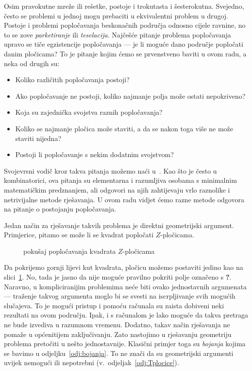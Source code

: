 \documentclass[11pt]{scrartcl}
\begin{document}
Osim pravokutne mreže ili rešetke, postoje i trokutasta i šesterokutna. Svejedno, često se problemi u jednoj mogu prebaciti u ekvivalentni problem u drugoj. Postoje i problemi popločavanja beskonačnih područja odnosno cijele ravnine, no to se zove \emph{parketiranje} ili \emph{teselacija}. Najčešće pitanje problema popločavanja upravo se tiče egzistencije popločavanja --- je li moguće dano područje popločati danim pločicama? To je pitanje kojim ćemo se prvenstveno baviti u ovom radu, a neka od drugih su:
\begin{itemize}
\item Koliko različitih popločavanja postoji?
\item Ako popločavanje ne postoji, koliko najmanje polja može ostati nepokriveno?
\item Koja su zajednička svojstva raznih popločavanja?
\item Koliko se najmanje pločica može staviti, a da se nakon toga više ne može staviti nijedna?
\item Postoji li popločavanje s nekim dodatnim svojstvom?
\end{itemize}

Svojevrsni vodič kroz takva pitanja možemo naći u~\cite{tilings}. Kao što je često u kombinatorici, ova pitanja su elementarna i razumljiva osobama s minimalnim matematičkim predznanjem, ali odgovori na njih zahtijevaju vrlo raznolike i netrivijalne metode rješavanja. U ovom radu vidjet ćemo razne metode odgovora na pitanje o postojanju popločavanja.

Jedan način za rješavanje takvih problema je direktni geometrijski argument. Primjerice, pitamo se može li se kvadrat popločati $Z$-pločicama.
\begin{figure}[h!]
\centering
{}
\caption{pokušaj popločavanja kvadrata $Z$-pločicama}
\label{slikaZ}
\end{figure}
Da pokrijemo gornji lijevi kut kvadrata, pločicu možemo postaviti jedino kao na slici~\ref{slikaZ}. No, tada je jasno da nije moguće pravilno pokriti polje označeno s \textbf{?}. Naravno, u kompliciranijim problemima neće biti ovako jednostavnih argumenata --- traženje takvog argumenta moglo bi se svesti na iscrpljivanje svih mogućih slučajeva. To je mogući pristup i pomoću računala su zaista dobiveni neki rezultati na ovom području. Ipak, i s računalom je lako moguće da takva pretraga ne bude izvediva u razumnom vremenu. Dodatno, takav način rješavanja ne pomaže u općenitijem zaključivanju. Zato nastojimo u rješavanju geometriju problema pretočiti u nešto jednostavnije. Klasični primjer toga su \emph{bojanja} kojima se bavimo u odjeljku~\ref{odj:bojanja}. To ne znači da su geometrijski argumenti uvijek nemogući ili nepotrebni (v.\ odjeljak~\ref{odj:Tplocice}).
\end{document}

